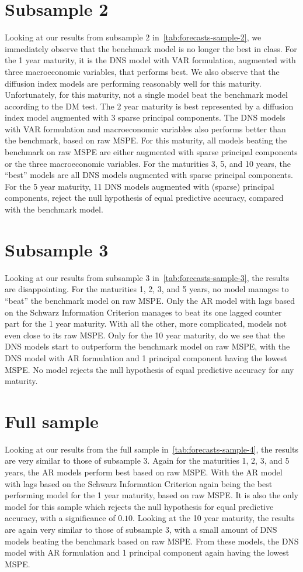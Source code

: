 \section{Subsample 2}
Looking at our results from subsample 2 in~\cref{tab:forecasts-sample-2}, we immediately observe that the benchmark model is no longer the best in class. 
For the 1 year maturity, it is the DNS model with VAR formulation, augmented with three macroeconomic variables, that performs best. 
We also observe that the diffusion index models are performing reasonably well for this maturity. 
Unfortunately, for this maturity, not a single model beat the benchmark model according to the DM test. 
The 2 year maturity is best represented by a diffusion index model augmented with 3 sparse principal components. 
The DNS models with VAR formulation and macroeconomic variables also performs better than the benchmark, based on raw MSPE.
For this maturity, all models beating the benchmark on raw MSPE are either augmented with sparse principal components or the three macroeconomic variables.
For the maturities 3, 5, and 10 years, the \enquote{best} models are all DNS models augmented with sparse principal components. 
For the 5 year maturity, 11 DNS models augmented with (sparse) principal components, reject the null hypothesis of equal predictive accuracy, compared with the benchmark model. 

\section{Subsample 3}
Looking at our results from subsample 3 in~\cref{tab:forecasts-sample-3}, the results are disappointing. 
For the maturities 1, 2, 3, and 5 years, no model manages to \enquote{beat} the benchmark model on raw MSPE. 
Only the AR model with lags based on the Schwarz Information Criterion manages to beat its one lagged counter part for the 1 year maturity. 
With all the other, more complicated, models not even close to its raw MSPE. 
Only for the 10 year maturity, do we see that the DNS models start to outperform the benchmark model on raw MSPE, with the DNS model with AR formulation and 1 principal component having the lowest MSPE.
No model rejects the null hypothesis of equal predictive accuracy for any maturity. 

\section{Full sample}
Looking at our results from the full sample in~\cref{tab:forecasts-sample-4}, the results are very similar to those of subsample 3. 
Again for the maturities 1, 2, 3, and 5 years, the AR models perform best based on raw MSPE. 
With the AR model with lags based on the Schwarz Information Criterion again being the best performing model for the 1 year maturity, based on raw MSPE.
It is also the only model for this sample which rejects the null hypothesis for equal predictive accuracy, with a significance of $0.10$. 
Looking at the 10 year maturity, the results are again very similar to those of subsample 3, with a small amount of DNS models beating the benchmark based on raw MSPE.
From these models, the DNS model with AR formulation and 1 principal component again having the lowest MSPE. 

